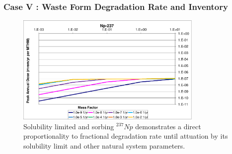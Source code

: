 \begin{frame}[c]
  \frametitle{Case V : Waste Form Degradation Rate and Inventory}

\begin{figure}[ht!]
\centering
\includegraphics[width=0.8\textwidth]{WFDegAndInv/Np-237-MF.eps}
\caption{
  Solubility limited and sorbing $^{237}Np$ demonstrates a direct proportionality 
to fractional degradation rate until attuation by its solubility limit and other 
natural system parameters. } 
\label{fig:WFDegNp237MF}
\end{figure}

\end{frame}

